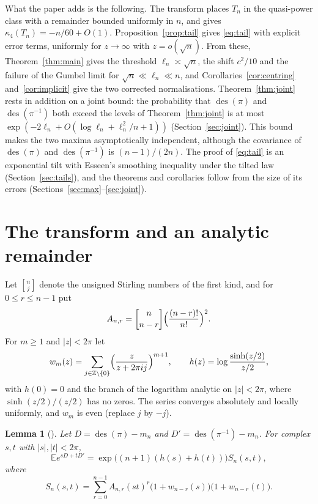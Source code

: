 \documentclass[11pt]{amsart}
\newtheorem{lemma}[theorem]{Lemma}
\theoremstyle{remark}
\newcommand{\des}{\operatorname{des}}
\newcommand{\E}{\mathbb{E}}
\newcommand{\Z}{\mathbb{Z}}
\newcommand{\stirl}[2]{\genfrac{[}{]}{0pt}{}{#1}{#2}}
\begin{document}
What the paper adds is the following. The transform places $T_n$ in the quasi-power class with a remainder bounded uniformly in $n$, and gives $\kappa_4(T_n)=-n/60+O(1)$. Proposition~\ref{prop:tail} gives \eqref{eq:tail} with explicit error terms, uniformly for $z\to\infty$ with $z=o(\sqrt n)$. From these, Theorem~\ref{thm:main} gives the threshold $\ell_n\asymp\sqrt n$, the shift $c^2/10$ and the failure of the Gumbel limit for $\sqrt n\ll\ell_n\ll n$, and Corollaries~\ref{cor:centring} and~\ref{cor:implicit} give the two corrected normalisations. Theorem~\ref{thm:joint} rests in addition on a joint bound: the probability that $\des(\pi)$ and $\des(\pi^{-1})$ both exceed the levels of Theorem~\ref{thm:joint} is at most $\exp(-2\ell_n+O(\log\ell_n+\ell_n^2/n+1))$ (Section~\ref{sec:joint}). This bound makes the two maxima asymptotically independent, although the covariance of $\des(\pi)$ and $\des(\pi^{-1})$ is $(n-1)/(2n)$. The proof of \eqref{eq:tail} is an exponential tilt with Esseen's smoothing inequality under the tilted law (Section~\ref{sec:tails}), and the theorems and corollaries follow from the size of its errors (Sections~\ref{sec:max}--\ref{sec:joint}).

\section{The transform and an analytic remainder}\label{sec:transform}

Let $\stirl{n}{j}$ denote the unsigned Stirling numbers of the first kind, and for $0\le r\le n-1$ put
\[
A_{n,r}=\stirl{n}{n-r}\Bigl(\frac{(n-r)!}{n!}\Bigr)^2.
\]
For $m\ge1$ and $|z|<2\pi$ let
\[
w_m(z)=\sum_{j\in\Z\setminus\{0\}}\Bigl(\frac{z}{z+2\pi ij}\Bigr)^{m+1},\qquad h(z)=\log\frac{\sinh(z/2)}{z/2},
\]
with $h(0)=0$ and the branch of the logarithm analytic on $|z|<2\pi$, where $\sinh(z/2)/(z/2)$ has no zeros. The series converges absolutely and locally uniformly, and $w_m$ is even (replace $j$ by $-j$).

\begin{lemma}[{\cite[Lemma~6.1]{BBFR24}}]\label{lem:transform}
Let $D=\des(\pi)-m_n$ and $D'=\des(\pi^{-1})-m_n$. For complex $s,t$ with $|s|,|t|<2\pi$,
\begin{equation}\label{eq:transform}
\E e^{sD+tD'}=\exp\bigl((n+1)(h(s)+h(t))\bigr)S_n(s,t),
\end{equation}
where
\[
S_n(s,t)=\sum_{r=0}^{n-1}A_{n,r}(st)^r\bigl(1+w_{n-r}(s)\bigr)\bigl(1+w_{n-r}(t)\bigr).
\]
\end{lemma}
\end{document}
